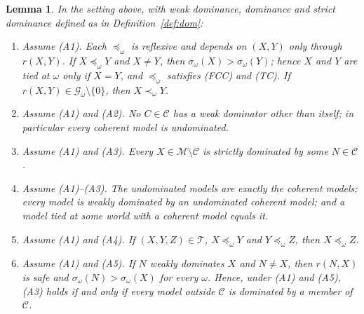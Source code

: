 \documentclass[11pt]{article}
\newcommand{\M}{\mathcal{M}}
\newcommand{\CC}{\mathcal{C}}
\theoremstyle{plain}
\newtheorem{lemma}[theorem]{Lemma}
\theoremstyle{definition}
\theoremstyle{remark}
\begin{document}
\begin{lemma}\label{lem:abstract}
In the setting above, with weak dominance, dominance and strict dominance defined as in
Definition~\ref{def:dom}:
\begin{enumerate}[label=(\alph*)]
  \item Assume (A1). Each $\preceq_\omega$ is reflexive and depends on $(X,Y)$ only through
  $r(X,Y)$. If $X\preceq_\omega Y$ and $X\ne Y$, then $\sigma_\omega(X)>\sigma_\omega(Y)$;
  hence $X$ and $Y$ are tied at $\omega$ only if $X=Y$, and $\preceq_\omega$ satisfies
  (FCC) and (TC). If $r(X,Y)\in\mathcal G_\omega\setminus\{0\}$, then $X\prec_\omega Y$.
  \item Assume (A1) and (A2). No $C\in\CC$ has a weak dominator other than itself; in
  particular every coherent model is undominated.
  \item Assume (A1) and (A3). Every $X\in\M\setminus\CC$ is strictly dominated by some
  $N\in\CC$.
  \item Assume (A1)--(A3). The undominated models are exactly the coherent models; every
  model is weakly dominated by an undominated coherent model; and a model tied at some
  world with a coherent model equals it.
  \item Assume (A1) and (A4). If $(X,Y,Z)\in\mathcal T$, $X\preceq_\omega Y$ and
  $Y\preceq_\omega Z$, then $X\preceq_\omega Z$.
  \item Assume (A1) and (A5). If $N$ weakly dominates $X$ and $N\ne X$, then $r(N,X)$ is
  safe and $\sigma_\omega(N)>\sigma_\omega(X)$ for every $\omega$. Hence, under (A1) and
  (A5), (A3) holds if and only if every model outside $\CC$ is dominated by a member of
  $\CC$.
\end{enumerate}
\end{lemma}
\end{document}
